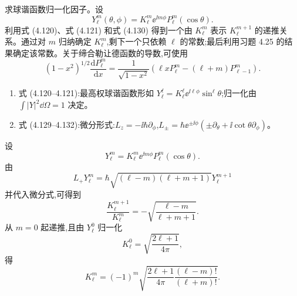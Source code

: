 \begin{question}
求球谐函数归一化因子。设
\[
Y_\ell^m(\theta,\phi)=K_\ell^m \ee^{\ii m\phi}P_\ell^m(\cos\theta).
\]
利用式 (4.120)、式 (4.121) 和式 (4.130) 得到一个由 $K_\ell^m$ 表示 $K_\ell^{m+1}$ 的递推关系。通过对 $m$ 归纳确定 $K_\ell^m$,剩下一个只依赖 $\ell$ 的常数;最后利用习题 4.25 的结果确定该常数。关于缔合勒让德函数的导数,可使用
\[
(1-x^2)^{1/2}\frac{\mathrm dP_\ell^m}{\mathrm dx}=\frac{1}{\sqrt{1-x^2}}\left(\ell xP_\ell^m-(\ell+m)P_{\ell-1}^m\right).
\]

\par\smallskip
{}
\begin{enumerate}[leftmargin=2.2em,itemsep=0.12em,topsep=0.12em,parsep=0pt]
\item 式 (4.120--4.121):最高权球谐函数形如 $Y_\ell^\ell=K_\ell^\ell \ee^{\ii\ell\phi}\sin^\ell\theta$;归一化由 $\int|Y|^2\dd\Omega=1$ 决定。
\item 式 (4.129--4.132):微分形式:$L_z=-\ii\hbar\partial_\phi$,$L_\pm=\hbar \ee^{\pm\ii\phi}(\pm\partial_\theta+\ii\cot\theta\partial_\phi)$。
\end{enumerate}

\begin{solution}

设
\[
Y_\ell^m=K_\ell^m \ee^{\ii m\phi}P_\ell^m(\cos\theta).
\]
由
\[
L_+Y_\ell^m=\hbar\sqrt{(\ell-m)(\ell+m+1)}Y_\ell^{m+1}
\]
并代入微分式,可得到
\[
\frac{K_\ell^{m+1}}{K_\ell^m}=-\sqrt{\frac{\ell-m}{\ell+m+1}}.
\]
从 $m=0$ 起递推,且由 $Y_\ell^0$ 归一化
\[
K_\ell^0=\sqrt{\frac{2\ell+1}{4\pi}},
\]
得
\[
K_\ell^m=(-1)^m\sqrt{\frac{2\ell+1}{4\pi}\frac{(\ell-m)!}{(\ell+m)!}}.
\]

\end{solution}
\end{question}

